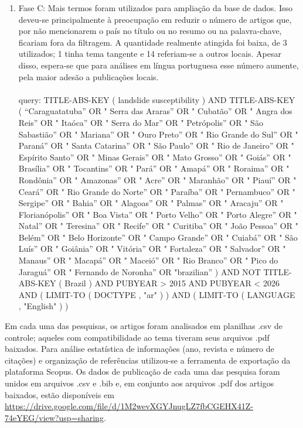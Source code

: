\documentclass[onecolumn, A4]{article}
\begin{document}
\begin{enumerate}
	\item[c)] Fase C:
Mais termos foram utilizados para ampliação da base de dados. Isso deveu-se principalmente à preocupação em reduzir o número de artigos que, por não mencionarem o país no título ou no resumo ou na palavra-chave, ficariam fora da filtragem. A quantidade realmente atingida foi baixa, de 3 utilizados; 1 tinha tema tangente e 14 referiam-se a outros locais. Apesar disso, espera-se que para análises em língua portuguesa esse número aumente, pela maior adesão a publicações locais. \\ \\
{\small query: TITLE-ABS-KEY ( landslide susceptibility ) AND TITLE-ABS-KEY ( ``Caraguatatuba'' OR " Serra das Araras'' OR " Cubatão'' OR " Angra dos Reis'' OR " Itaóca'' OR " Serra do Mar'' OR " Petrópolis'' OR " São Sabastião'' OR " Mariana'' OR " Ouro Preto'' OR " Rio Grande do Sul'' OR " Paraná'' OR " Santa Catarina'' OR " São Paulo'' OR " Rio de Janeiro'' OR " Espírito Santo'' OR " Minas Gerais'' OR " Mato Grosso'' OR " Goiás'' OR " Brasília'' OR " Tocantins'' OR " Pará'' OR " Amapá'' OR " Roraima'' OR " Rondônia'' OR " Amazonas'' OR " Acre'' OR " Maranhão'' OR " Piauí'' OR " Ceará'' OR " Rio Grande do Norte'' OR " Paraíba'' OR " Pernambuco'' OR " Sergipe'' OR " Bahia'' OR " Alagoas'' OR " Palmas'' OR " Aracaju'' OR " Florianópolis'' OR " Boa Vista'' OR " Porto Velho'' OR " Porto Alegre'' OR " Natal'' OR " Teresina'' OR " Recife'' OR " Curitiba'' OR " João Pessoa'' OR " Belém'' OR " Belo Horizonte'' OR " Campo Grande'' OR " Cuiabá'' OR " São Luís'' OR " Goiânia'' OR " Vitória'' OR " Fortaleza'' OR " Salvador'' OR " Manaus'' OR " Macapá'' OR " Maceió'' OR " Rio Branco'' OR " Pico do Jaraguá'' OR " Fernando de Noronha'' OR "brazilian'' ) AND NOT TITLE-ABS-KEY ( Brazil ) AND PUBYEAR > 2015 AND PUBYEAR < 2026 AND ( LIMIT-TO ( DOCTYPE , "ar" ) ) AND ( LIMIT-TO ( LANGUAGE , "English" ) ) }
\end{enumerate}

Em cada uma das pesquisas, os artigos foram analisados em planilhas .csv de controle; aqueles com compatibilidade ao tema tiveram seus arquivos .pdf baixados. Para análise estatística de informações (ano, revista e número de citações) e
organização de referências utilizou-se a ferramenta de exportação da plataforma Scopus.
Os dados de publicação de cada uma das pesquisa foram unidos em arquivos .csv e .bib
e, em conjunto aos arquivos .pdf dos artigos baixados, estão disponíveis em \url{https://drive.google.com/file/d/1M2wevXGYJnugLZ7fbCGEHX41Z-74eYEG/view?usp=sharing}.
\end{document}
